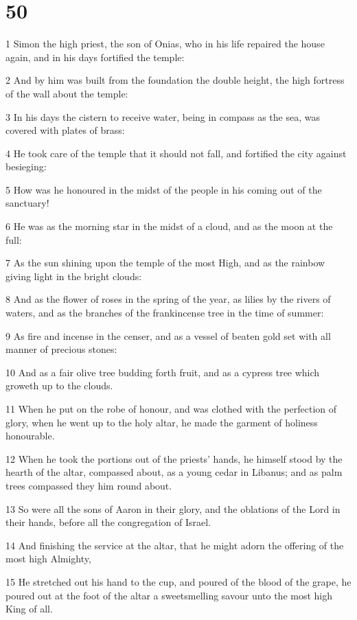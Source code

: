 \chapter{50}

\par 1 Simon the high priest, the son of Onias, who in his life repaired the house again, and in his days fortified the temple:
\par 2 And by him was built from the foundation the double height, the high fortress of the wall about the temple:
\par 3 In his days the cistern to receive water, being in compass as the sea, was covered with plates of brass:
\par 4 He took care of the temple that it should not fall, and fortified the city against besieging:
\par 5 How was he honoured in the midst of the people in his coming out of the sanctuary!
\par 6 He was as the morning star in the midst of a cloud, and as the moon at the full:
\par 7 As the sun shining upon the temple of the most High, and as the rainbow giving light in the bright clouds:
\par 8 And as the flower of roses in the spring of the year, as lilies by the rivers of waters, and as the branches of the frankincense tree in the time of summer:
\par 9 As fire and incense in the censer, and as a vessel of beaten gold set with all manner of precious stones:
\par 10 And as a fair olive tree budding forth fruit, and as a cypress tree which groweth up to the clouds.
\par 11 When he put on the robe of honour, and was clothed with the perfection of glory, when he went up to the holy altar, he made the garment of holiness honourable.
\par 12 When he took the portions out of the priests' hands, he himself stood by the hearth of the altar, compassed about, as a young cedar in Libanus; and as palm trees compassed they him round about.
\par 13 So were all the sons of Aaron in their glory, and the oblations of the Lord in their hands, before all the congregation of Israel.
\par 14 And finishing the service at the altar, that he might adorn the offering of the most high Almighty,
\par 15 He stretched out his hand to the cup, and poured of the blood of the grape, he poured out at the foot of the altar a sweetsmelling savour unto the most high King of all.
